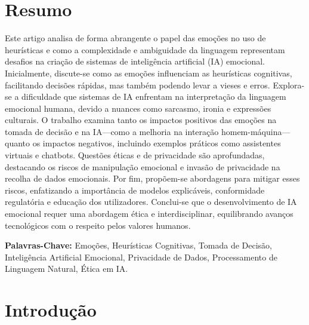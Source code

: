 \documentclass[a4paper,12pt]{report}
\begin{document}
	
	\newpage
	\thispagestyle{empty}
	\mbox{}
	\newpage
	
	
	\section*{Resumo}
	
	Este artigo analisa de forma abrangente o papel das emoções no uso de heurísticas e como a complexidade e ambiguidade da linguagem representam desafios na criação de sistemas de inteligência artificial (IA) emocional. Inicialmente, discute-se como as emoções influenciam as heurísticas cognitivas, facilitando decisões rápidas, mas também podendo levar a vieses e erros. Explora-se a dificuldade que sistemas de IA enfrentam na interpretação da linguagem emocional humana, devido a nuances como sarcasmo, ironia e expressões culturais. O trabalho examina tanto os impactos positivos das emoções na tomada de decisão e na IA—como a melhoria na interação homem-máquina—quanto os impactos negativos, incluindo exemplos práticos como assistentes virtuais e chatbots. Questões éticas e de privacidade são aprofundadas, destacando os riscos de manipulação emocional e invasão de privacidade na recolha de dados emocionais. Por fim, propõem-se abordagens para mitigar esses riscos, enfatizando a importância de modelos explicáveis, conformidade regulatória e educação dos utilizadores. Conclui-se que o desenvolvimento de IA emocional requer uma abordagem ética e interdisciplinar, equilibrando avanços tecnológicos com o respeito pelos valores humanos.
	
	\vspace{4em}
	
	\noindent\textbf{Palavras-Chave:} \normalsize{Emoções, Heurísticas Cognitivas, Tomada de Decisão, Inteligência Artificial Emocional, Privacidade de Dados, Processamento de Linguagem Natural, Ética em IA.}
	
	\newpage
	
	
	\section{Introdução}
	
\end{document}
